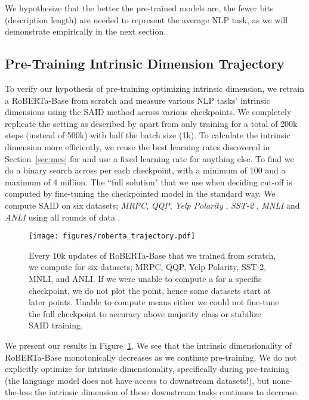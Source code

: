 \documentclass{article} \usepackage{iclr2020_conference,times}
\begin{document}
We hypothesize that the better the pre-trained models are, the fewer bits (description length) are needed to represent the average NLP task, as we will demonstrate empirically in the next section.

\subsection{Pre-Training Intrinsic Dimension Trajectory}
\label{sec:trajectory}
To verify our hypothesis of pre-training optimizing intrinsic dimension, we retrain a RoBERTa-Base from scratch and measure various NLP tasks' intrinsic dimensions using the SAID method across various checkpoints. We completely replicate the setting as described by \citep{ROBERTA} apart from only training for a total of 200k steps (instead of 500k) with half the batch size (1k). To calculate the intrinsic dimension more efficiently, we reuse the best learning rates discovered in Section~\ref{sec:mes} for  and use a fixed learning rate for anything else. To find  we do a binary search across  per each checkpoint, with a minimum  of 100 and a maximum of 4 million. The ``full solution" that we use when deciding  cut-off is computed by fine-tuning the checkpointed model in the standard way. We compute SAID on six datasets; \textit{MRPC}, \textit{QQP}, \textit{Yelp Polarity} \citep{yelp_polarity}, \textit{SST-2} \citep{sst2}, \textit{MNLI} \citep{mnli} and \textit{ANLI} using all rounds of data \citep{anli}.

\begin{figure}
    \centering
    \texttt{[image: figures/roberta\_trajectory.pdf]}
    \caption{Every 10k updates of RoBERTa-Base that we trained from scratch, we compute  for six datasets; MRPC, QQP, Yelp Polarity, SST-2, MNLI, and ANLI. If we were unable to compute a  for a specific checkpoint, we do not plot the point, hence some datasets start at later points. Unable to compute means either we could not fine-tune the full checkpoint to accuracy above majority class or stabilize SAID training.}
    \label{fig:roberta_id}
\end{figure}

We present our results in Figure~\ref{fig:roberta_id}. We see that the intrinsic dimensionality of RoBERTa-Base monotonically decreases as we continue pre-training. We do not explicitly optimize for intrinsic dimensionality, specifically during pre-training (the language model does not have access to downstream datasets!), but none-the-less the intrinsic dimension of these downstream tasks continues to decrease.
\end{document}
